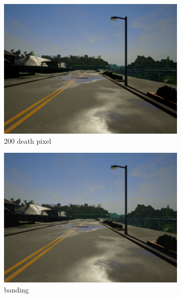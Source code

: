 \documentclass[14pt]{extarticle}
\begin{document}
\begin{figure}
\begin{subfigure}[b]{0.3\textwidth}
	         \centering
			 \includegraphics[scale=0.1]{./foto_sporcature/200_death_pixels.png}
	         \caption{200 death pixel}
	         \label{fig:200}
	     \end{subfigure}
	     \hfill
	     \begin{subfigure}[b]{0.3\textwidth}
	         \centering
		     \includegraphics[scale=0.1]{./foto_sporcature/banding.png}
	         \caption{banding}
	         \label{fig:banding}
	     \end{subfigure}
	     \hfill
	     \begin{subfigure}[b]{0.3\textwidth}
	         \centering

\end{subfigure}
\end{figure}
\end{document}
